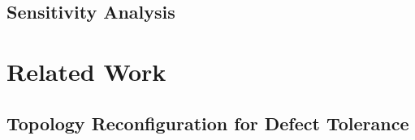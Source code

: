 \documentclass[sigconf, screen, review]{acmart}
\begin{document}

\subsection{Sensitivity Analysis}
\label{sec:sensitivity}

%



\section{Related Work}
\label{sec:related}

\subsection{Topology Reconfiguration for Defect Tolerance}
\end{document}
